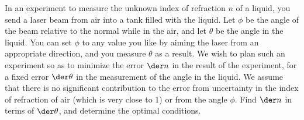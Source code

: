 In an experiment to measure the unknown index of refraction $n$ of a liquid, you send
a laser beam from air into a tank filled with the liquid. 
Let $\phi$ be the angle of the beam relative to the normal while in the
air, and let $\theta$ be the angle in the liquid. You can set $\phi$ to any value you
like by aiming the laser from an appropriate direction, and you measure $\theta$ as
a result. We wish to plan such an experiment so as to minimize
the error $\der n$ in the result of the experiment, for a fixed error $\der \theta$
in the measurement of the angle in the liquid. We assume that there is no significant
contribution to the error from uncertainty in the index of refraction of air (which is
very close to 1) or from the angle $\phi$. Find $\der n$ in terms of $\der\theta$, and
determine the optimal conditions.
